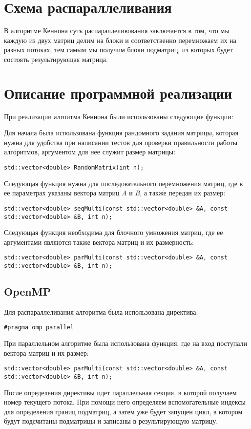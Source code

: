 \documentclass{report}
\begin{document}
\section*{Схема распараллеливания}
В алгоритме Кеннона суть распараллеливования заключается в том, что мы каждую из двух матриц делим на блоки и соответственно перемножаем их на разных потоках, тем самым мы получим блоки подматриц, из которых будет состоять результирующая матрица.
\newpage

\section*{Описание программной реализации}
При реализации алгоитма Кеннона были использованы следующие функции:
\par Для начала была использована функция рандомного задания матрицы, которая нужна для удобства при написании тестов для проверки правильности работы алгоритмов, аргументом для нее служит размер матрицы:
\begin{lstlisting}
std::vector<double> RandomMatrix(int n);
\end{lstlisting}
\par Следующая функция нужна для последовательного перемножения матриц, где в ее параметрах указаны вектора матриц {\itshape A} и {\itshape B}, а также передан их размер:
\begin{lstlisting}
std::vector<double> seqMulti(const std::vector<double> &A, const std::vector<double> &B, int n);
\end{lstlisting}
\par Следующая функция необходима для блочного умножения матриц, где ее аргументами являются также вектора матриц и их размерность:
\begin{lstlisting}
std::vector<double> parMulti(const std::vector<double> &A, const std::vector<double> &B, int n);
\end{lstlisting}
\subsection*{OpenMP}
Для распараллеливания алгоритма была использована директива:
\par\verb|#pragma omp parallel | 
\par При параллельном алгоритме была использована функция, где на вход поступали вектора матриц и их размер:
\begin{lstlisting}
std::vector<double> parMulti(const std::vector<double> &A, const std::vector<double> &B, int n);
\end{lstlisting}
\par После определения директивы идет параллельная секция, в которой получаем номер текущего потока. При помощи него определяем вспомогательные индексы для определения границ подматриц, а затем уже будет запущен цикл, в котором будут подсчитаны подматрицы и записаны в результирующую матрицу.
\end{document}
